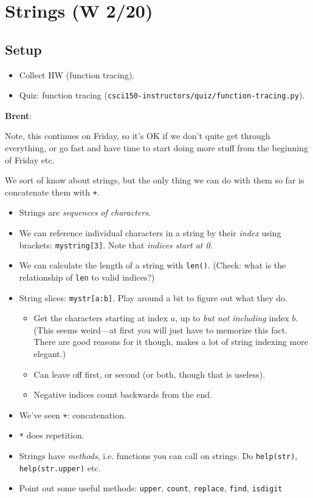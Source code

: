 \documentclass{article}
\newenvironment{reflect}[1]
{
  \noindent
  \begin{lrbox}{\reflectbox}
    \begin{minipage}[t]{\textwidth}
      \textbf{#1}:
}{
    \end{minipage}
  \end{lrbox}
  \fbox{\usebox{\reflectbox}}
}
\newcommand{\ready}{\textcolor{Green}{\Checkmark}\xspace}
\begin{document}
\newpage
\section{\ready Strings (W 2/20)}

\subsection*{Setup}
\begin{itemize}
\item Collect HW (function tracing).
\item Quiz: function tracing (\texttt{csci150-instructors/quiz/function-tracing.py}).
\end{itemize}

\begin{reflect}{Brent}
  Note, this continues on Friday, so it's OK if we don't quite get
  through everything, or go fast and have time to start doing more
  stuff from the beginning of Friday etc.
\end{reflect}

We sort of know about strings, but the only thing we can do with them
so far is concatenate them with \verb|+|.

\begin{itemize}
\item Strings are \emph{sequences of characters}.

\item We can reference individual characters in a string by their
  \emph{index} using brackets: \verb|mystring[3]|.  Note that
  \emph{indices start at 0}.

\item We can calculate the length of a string with \verb|len()|.
  (Check: what is the relationship of \verb|len| to valid indices?)

\item String slices: \verb|mystr[a:b]|.  Play around a bit to figure
  out what they do.
  \begin{itemize}
  \item Get the characters starting at index $a$, up to \emph{but not
      including} index $b$.  (This seems weird---at first you will just
    have to memorize this fact.  There are good reasons for it though,
    makes a lot of string indexing more elegant.)
  \item Can leave off first, or second (or both, though that is
    useless).
  \item Negative indices count backwards from the end.
  \end{itemize}

\item We've seen \verb|+|: concatenation.
\item \verb|*| does repetition.

\item Strings have \emph{methods}, i.e. functions you can call on
  strings.  Do \verb|help(str)|, \verb|help(str.upper)| etc.
\item Point out some useful methods: \verb|upper|, \verb|count|,
  \verb|replace|, \verb|find|, \verb|isdigit|
\end{itemize}
\end{document}
